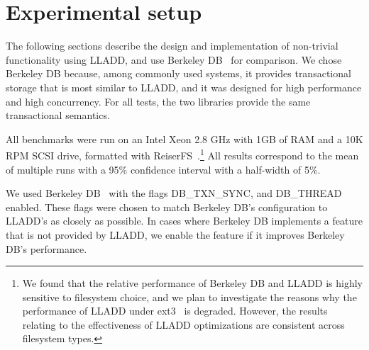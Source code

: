 \documentclass[10pt,letterpaper,twocolumn,english]{article}
\newcommand{\yad}{LLADD\xspace}
\begin{document}
%



\section{Experimental setup}
\label{sec:experimental_setup}

The following sections describe the design and implementation of
non-trivial functionality using \yad, and use Berkeley DB~\cite{bdb} for
comparison.  We chose Berkeley DB because, among
commonly used systems, it provides transactional storage that is most
similar to \yad, and it was
designed for high performance and high concurrency.
For all tests, the two libraries provide the same transactional semantics.

All benchmarks were run on an Intel Xeon 2.8 GHz with 1GB of RAM and a
10K RPM SCSI drive, formatted with ReiserFS~\cite{reiser3}.\footnote{We found that the
relative performance of Berkeley DB and \yad is highly sensitive to
filesystem choice, and we plan to investigate the reasons why the
performance of \yad under ext3~\cite{ext3} is degraded. However, the results
relating to the effectiveness of \yad optimizations are consistent across filesystem
types.}  All results correspond to the mean of multiple runs
with a 95\% confidence interval with a half-width of 5\%.

We used Berkeley DB~\cite{bdb} with the flags DB\_TXN\_SYNC, and DB\_THREAD
enabled. These flags were chosen to match 
Berkeley DB's configuration to \yad's as closely as possible.  In cases where
Berkeley DB implements a feature that is not provided by \yad, we
enable the feature if it improves Berkeley DB's performance.
\end{document}
